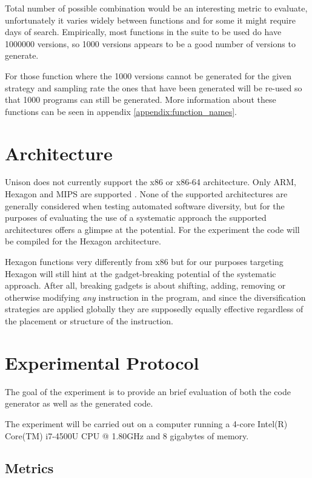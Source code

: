 Total number of possible combination would be an interesting metric to evaluate, unfortunately
it varies widely between functions and for some it might require days of search. Empirically,
most functions in the suite to be used do have 1000000 versions, so 1000 versions appears
to be a good number of versions to generate.

For those function where the 1000 versions cannot be generated for the given strategy and
sampling rate the ones that have been generated will be re-used so that 1000 programs can
still be generated. More information about these functions can be seen in appendix
\ref{appendix:function_names}.

\section{Architecture}
\label{sec:arch}

Unison does not currently support the x86 or x86-64 architecture. Only ARM, Hexagon and MIPS
are supported \cite{unison-src}. None of the supported architectures are generally considered
when testing automated software diversity, but for the purposes of evaluating the use of
a systematic approach the supported architectures offers a glimpse at the potential. For
the experiment the code will be compiled for the Hexagon architecture.

Hexagon functions very differently from x86 but for our purposes targeting Hexagon will
still hint at the gadget-breaking potential of the systematic approach. After all,
breaking gadgets is about shifting, adding, removing or otherwise modifying \textit{any}
instruction in the program, and since the diversification strategies are applied globally
they are supposedly equally effective regardless of the placement or structure of the
instruction.

\section{Experimental Protocol}

The goal of the experiment is to provide an brief evaluation of both the code generator as
well as the generated code.

The experiment will be carried out on a computer running a 4-core Intel(R) Core(TM)
i7-4500U CPU @ 1.80GHz and 8 gigabytes of memory.


\subsection{Metrics}

